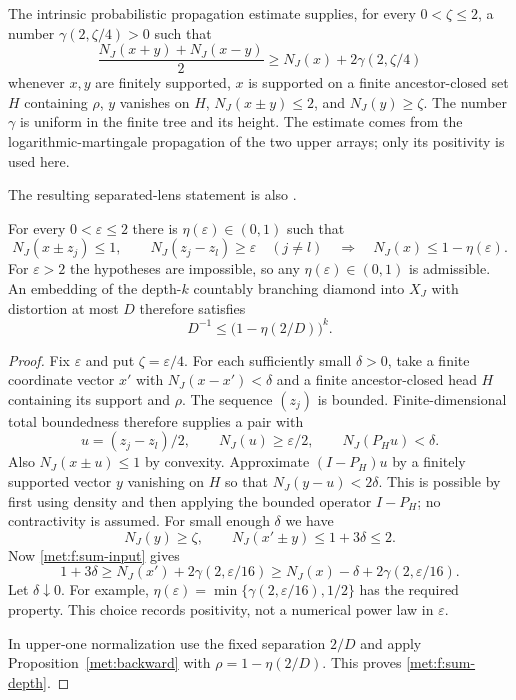 The intrinsic probabilistic propagation estimate
\cite[Lemmas~6.1 and~6.2]{RecursivePotentials} supplies, for every
$0<\zeta\le2$, a number $\gamma(2,\zeta/4)>0$ such that
\begin{equation}\label{met:f:sum-input}
 \frac{N_J(x+y)+N_J(x-y)}2
 \ge N_J(x)+2\gamma(2,\zeta/4)
\end{equation}
whenever $x,y$ are finitely supported, $x$ is supported on a finite
ancestor-closed set $H$ containing $\rho$, $y$ vanishes on $H$,
$N_J(x\pm y)\le2$, and $N_J(y)\ge\zeta$.
The number $\gamma$ is uniform in the finite tree and its height.
The estimate comes from the logarithmic-martingale propagation of the
two upper arrays; only its positivity is used here.

The resulting separated-lens statement is also
\cite[Theorem~6.3]{RecursivePotentials}.

\begin{proposition}\label{met:f:sum}
For every $0<\varepsilon\le2$ there is
$\eta(\varepsilon)\in(0,1)$ such that
\[
 N_J(x\pm z_j)\le1,
 \qquad N_J(z_j-z_l)\ge\varepsilon\quad(j\ne l)
 \quad\Longrightarrow\quad
 N_J(x)\le1-\eta(\varepsilon).
\]
For $\varepsilon>2$ the hypotheses are impossible, so any
$\eta(\varepsilon)\in(0,1)$ is admissible.
An embedding of the depth-$k$ countably branching diamond into
$X_J$ with distortion at most $D$ therefore satisfies
\begin{equation}\label{met:f:sum-depth}
 D^{-1}\le\bigl(1-\eta(2/D)\bigr)^k.
\end{equation}
\end{proposition}

\begin{proof}
Fix $\varepsilon$ and put $\zeta=\varepsilon/4$.
For each sufficiently small $\delta>0$, take a finite coordinate
vector $x'$ with $N_J(x-x')<\delta$ and a finite
ancestor-closed head $H$ containing its support and $\rho$.
The sequence $(z_j)$ is bounded.  Finite-dimensional total boundedness
therefore supplies a pair with
\[
 u=(z_j-z_l)/2,
 \qquad N_J(u)\ge\varepsilon/2,
 \qquad N_J(P_Hu)<\delta.
\]
Also $N_J(x\pm u)\le1$ by convexity.  Approximate
$(I-P_H)u$ by a finitely supported vector $y$ vanishing on $H$ so
that $N_J(y-u)<2\delta$.  This is possible by first using
density and then applying the bounded operator $I-P_H$; no
contractivity is assumed.  For small enough $\delta$ we have
\[
 N_J(y)\ge\zeta,
 \qquad N_J(x'\pm y)\le1+3\delta\le2.
\]
Now \eqref{met:f:sum-input} gives
\[
 1+3\delta\ge N_J(x')+2\gamma(2,\varepsilon/16)
 \ge N_J(x)-\delta+2\gamma(2,\varepsilon/16).
\]
Let $\delta\downarrow0$.  For example,
$\eta(\varepsilon)=\min\{\gamma(2,\varepsilon/16),1/2\}$
has the required property.  This choice records positivity, not a
numerical power law in $\varepsilon$.

In upper-one normalization use the fixed separation $2/D$ and
apply Proposition~\ref{met:backward} with
$\rho=1-\eta(2/D)$. This proves \eqref{met:f:sum-depth}.
\end{proof}


